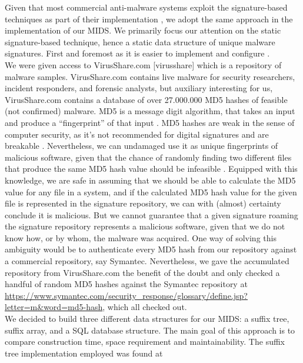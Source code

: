 \documentclass[12pt]{article} %
\begin{document}
Given that most commercial anti-malware systems exploit the signature-based techniques as part of their implementation \cite{kruegel2003using}, we adopt the same approach in the implementation of our MIDS. We primarily focus our attention on the static signature-based technique, hence a static data structure of unique malware signatures. First and foremost as it is easier to implement and configure \cite{kruegel2003using}.  \\
We were given access to VirusShare.com  [virusshare] which is a repository of malware samples.  VirusShare.com contains live malware for security researchers, incident responders, and forensic analysts, but auxiliary interesting for us, VirusShare.com contains a database of over 27.000.000 MD5 hashes of feasible (not confirmed) malware. MD5 is a message digit algorithm, that takes an input and produce a “fingerprint” of that input \cite{turner2011updated}. MD5 hashes are weak in the sense of computer security, as it's not recommended for digital signatures \cite{turner2011updated } and are breakable  \cite{turner2011updated, wang2005break}. Nevertheless, we can undamaged use it as unique fingerprints of malicious software, given that the chance of randomly finding two different files that produce the same MD5 hash value should be infeasible \cite{thompson2005md5}. Equipped with this knowledge, we are safe in assuming that we should be able to calculate the MD5 value for any file in a system,  and if the calculated MD5 hash value for the given file is represented in the signature repository, we can with (almost) certainty conclude it is malicious. But we cannot guarantee that a given signature roaming the signature repository represents a malicious software, given that we do not know how, or by whom, the malware was acquired. One way of solving this ambiguity would be to authenticate every MD5 hash from our repository against a commercial repository, say Symantec. Nevertheless, we gave the accumulated repository from VirusShare.com  the benefit of the doubt and only checked a handful of random MD5 hashes against the Symantec repository at \href{https://www.symantec.com/security_response/glossary/define.jsp?letter=m&word=md5-hash}{https://www.symantec.com/security_response/glossary/define.jsp?letter=m&word=md5-hash}, which all checked out. \\
We decided to build three different data structures for our MIDS: a suffix tree, suffix array, and a SQL database structure. The main goal of this approach is to compare construction time, space requirement and maintainability. The suffix tree implementation employed was found at \href{https://github.com/atillabyte/SuffixTree/tree/master/src/SuffixTree}\\
\end{document}
